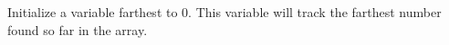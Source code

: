 \documentclass[preview]{standalone}
\begin{document}
Initialize a variable farthest to 0. This variable will track the farthest number found so far in the array.\\
\end{document}
